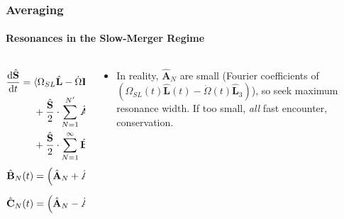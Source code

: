 \documentclass[dvipsnames, 8pt]{beamer}
\newcommand*{\rd}[2]{\frac{\mathrm{d}#1}{\mathrm{d}#2}}
\newcommand*{\bm}[1]{\boldsymbol{\mathbf{#1}}}
\newcommand*{\uv}[1]{\hat{\bm{#1}}}
\newcommand*{\ev}[1]{\langle#1\rangle}
\newcommand*{\p}[1]{\left(#1\right)}
\begin{document}
\begin{frame}
    \frametitle{Averaging}
    \framesubtitle{Resonances in the Slow-Merger Regime}

    \begin{columns}
        \begin{column}{0.5\textwidth}
            \begin{align}
                \rd{\uv{S}}{t} ={}&
                    \ev{\Omega_{SL}\uv{L} - \dot{\Omega} \uv{L_3}}_{LK}
                        \cdot \uv{S}\nonumber\\
                    &+\frac{\uv{S}}{2} \cdot \sum\limits_{N = 1}^{N'} \uv{A}_N
                        \cos \p{\frac{2\pi N t}{T_{LK}}}\nonumber\\
                    &+ \frac{\uv{S}}{2} \cdot \sum\limits_{N = 1}^\infty
                        \uv{B}_N \cos\p{\Omega_{\rm eff}t}
                        - \uv{C}_N \sin \p{\Omega_{\rm eff}t},\\
                \uv{B}_N(t) &= \p{\uv{A}_N + \uv{A}_{N + N'}}\cos \p{\frac{2\pi
                    \p{2N + N'}t}{T_{LK}}},\\
                \uv{C}_N(t) &= \p{\uv{A}_N - \uv{A}_{N + N'}}\sin \p{\frac{2\pi
                    \p{2N + N'}t}{T_{LK}}}.
            \end{align}
        \end{column}
        \begin{column}{0.5\textwidth}
            \begin{itemize}
                \item In reality, $\uv{A}_N$ are small (Fourier coefficients of
                    $\p{\Omega_{SL}(t)\uv{L}(t) - \dot{\Omega}(t)\uv{L}_3}$), so
                    seek maximum resonance width. If too small, \emph{all} fast
                    encounter, conservation.
            \end{itemize}
        \end{column}
    \end{columns}
\end{frame}
\end{document}
